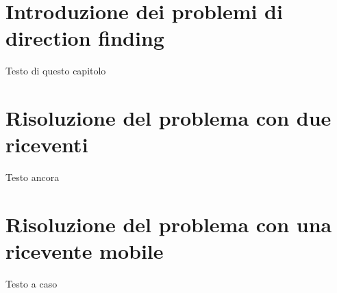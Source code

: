 \section{Introduzione dei problemi di direction finding}
Testo di questo capitolo

\section{Risoluzione del problema con due riceventi}
Testo ancora

\section{Risoluzione del problema con una ricevente mobile}
Testo a caso